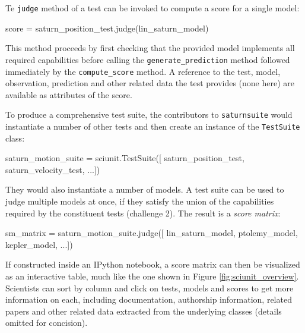 \documentclass[9pt]{sig-alternate}
\newcommand{\verbx}[1]{\lstinline{#1}}
\begin{document}
Te \verbx{judge} method of a test can be invoked to compute a score for a single model: 
\vspace{-4px}
\begin{python}
score = saturn_position_test.judge(lin_saturn_model)
\end{python}
\vspace{-5px}
This method proceeds by first checking that the provided model implements all required capabilities before calling the \verbx{generate_prediction} method followed immediately by the \verbx{compute_score} method. A reference to the test,   model, observation, prediction and other related data the test provides (none here) are available as attributes of the score.

To produce a comprehensive test suite, the contributors to \verbx{saturnsuite} would instantiate a number of other tests and then create an instance of the \verbx{TestSuite} class:
\begin{python}
saturn_motion_suite = sciunit.TestSuite([
  saturn_position_test, saturn_velocity_test, ...])
\end{python}
They would also instantiate a number of models. A test suite can be used to judge multiple models at once, if they satisfy the union of the capabilities required by the constituent tests (challenge 2). The result is a \emph{score matrix}:
\begin{python}
sm_matrix = saturn_motion_suite.judge([
  lin_saturn_model, ptolemy_model, kepler_model, ...])
\end{python}

If constructed inside an IPython notebook, a score matrix can then be visualized as an interactive table, much like the one shown in Figure \ref{fig:sciunit_overview}. Scientists can sort by column and click on tests, models and scores to get more information on each, including documentation, authorship information, related papers and other related data extracted from the underlying classes (details omitted for concision).

 
\end{document}

